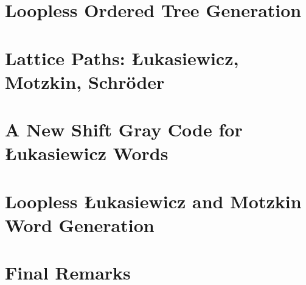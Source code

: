 \chapter{Loopless Ordered Tree Generation} \label{chap:otree-implementation}



\chapter{Lattice Paths: Łukasiewicz, Motzkin, Schröder} \label{chap:luka-background}
 

\chapter{A New Shift Gray Code for Łukasiewicz Words} \label{chap:luka-graycode}

\chapter{Loopless Łukasiewicz and Motzkin Word Generation} \label{chap:luka-implementation}


\chapter{Final Remarks}






